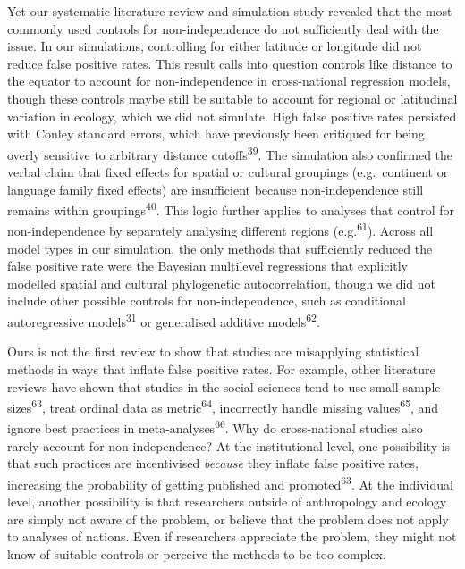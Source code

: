 \documentclass[english,man,floatsintext]{apa6}
\begin{document}
Yet our systematic literature review and simulation study revealed that the most commonly used controls for non-independence do not sufficiently deal with the issue. In our simulations, controlling for either latitude or longitude did not reduce false positive rates. This result calls into question controls like distance to the equator to account for non-independence in cross-national regression models, though these controls maybe still be suitable to account for regional or latitudinal variation in ecology, which we did not simulate. High false positive rates persisted with Conley standard errors, which have previously been critiqued for being overly sensitive to arbitrary distance cutoffs\textsuperscript{39}. The simulation also confirmed the verbal claim that fixed effects for spatial or cultural groupings (e.g.~continent or language family fixed effects) are insufficient because non-independence still remains within groupings\textsuperscript{40}. This logic further applies to analyses that control for non-independence by separately analysing different regions (e.g.\textsuperscript{61}). Across all model types in our simulation, the only methods that sufficiently reduced the false positive rate were the Bayesian multilevel regressions that explicitly modelled spatial and cultural phylogenetic autocorrelation, though we did not include other possible controls for non-independence, such as conditional autoregressive models\textsuperscript{31} or generalised additive models\textsuperscript{62}.

Ours is not the first review to show that studies are misapplying statistical methods in ways that inflate false positive rates. For example, other literature reviews have shown that studies in the social sciences tend to use small sample sizes\textsuperscript{63}, treat ordinal data as metric\textsuperscript{64}, incorrectly handle missing values\textsuperscript{65}, and ignore best practices in meta-analyses\textsuperscript{66}. Why do cross-national studies also rarely account for non-independence? At the institutional level, one possibility is that such practices are incentivised \emph{because} they inflate false positive rates, increasing the probability of getting published and promoted\textsuperscript{63}. At the individual level, another possibility is that researchers outside of anthropology and ecology are simply not aware of the problem, or believe that the problem does not apply to analyses of nations. Even if researchers appreciate the problem, they might not know of suitable controls or perceive the methods to be too complex.
\end{document}
